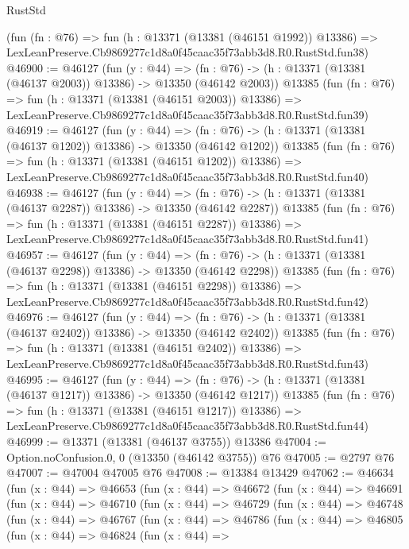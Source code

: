 \begin{lexlean}{RustStd}
\begin{coremodule}
    (fun (fn : @76) =>
    fun (h : @13371 (@13381 (@46151 @1992)) @13386) =>
    LexLeanPreserve.Cb9869277c1d8a0f45caac35f73abb3d8.R0.RustStd.fun38)
@46900 := @46127
    (fun (y : @44) =>
    (fn : @76) -> (h : @13371 (@13381 (@46137 @2003)) @13386) -> @13350 (@46142 @2003))
    @13385
    (fun (fn : @76) =>
    fun (h : @13371 (@13381 (@46151 @2003)) @13386) =>
    LexLeanPreserve.Cb9869277c1d8a0f45caac35f73abb3d8.R0.RustStd.fun39)
@46919 := @46127
    (fun (y : @44) =>
    (fn : @76) -> (h : @13371 (@13381 (@46137 @1202)) @13386) -> @13350 (@46142 @1202))
    @13385
    (fun (fn : @76) =>
    fun (h : @13371 (@13381 (@46151 @1202)) @13386) =>
    LexLeanPreserve.Cb9869277c1d8a0f45caac35f73abb3d8.R0.RustStd.fun40)
@46938 := @46127
    (fun (y : @44) =>
    (fn : @76) -> (h : @13371 (@13381 (@46137 @2287)) @13386) -> @13350 (@46142 @2287))
    @13385
    (fun (fn : @76) =>
    fun (h : @13371 (@13381 (@46151 @2287)) @13386) =>
    LexLeanPreserve.Cb9869277c1d8a0f45caac35f73abb3d8.R0.RustStd.fun41)
@46957 := @46127
    (fun (y : @44) =>
    (fn : @76) -> (h : @13371 (@13381 (@46137 @2298)) @13386) -> @13350 (@46142 @2298))
    @13385
    (fun (fn : @76) =>
    fun (h : @13371 (@13381 (@46151 @2298)) @13386) =>
    LexLeanPreserve.Cb9869277c1d8a0f45caac35f73abb3d8.R0.RustStd.fun42)
@46976 := @46127
    (fun (y : @44) =>
    (fn : @76) -> (h : @13371 (@13381 (@46137 @2402)) @13386) -> @13350 (@46142 @2402))
    @13385
    (fun (fn : @76) =>
    fun (h : @13371 (@13381 (@46151 @2402)) @13386) =>
    LexLeanPreserve.Cb9869277c1d8a0f45caac35f73abb3d8.R0.RustStd.fun43)
@46995 := @46127
    (fun (y : @44) =>
    (fn : @76) -> (h : @13371 (@13381 (@46137 @1217)) @13386) -> @13350 (@46142 @1217))
    @13385
    (fun (fn : @76) =>
    fun (h : @13371 (@13381 (@46151 @1217)) @13386) =>
    LexLeanPreserve.Cb9869277c1d8a0f45caac35f73abb3d8.R0.RustStd.fun44)
@46999 := @13371 (@13381 (@46137 @3755)) @13386
@47004 := Option.noConfusion.{0, 0} (@13350 (@46142 @3755)) @76
@47005 := @2797 @76
@47007 := @47004 @47005 @76
@47008 := @13384 @13429
@47062 := @46634
    (fun (x : @44) =>
    @46653
      (fun (x : @44) =>
      @46672
        (fun (x : @44) =>
        @46691
          (fun (x : @44) =>
          @46710
            (fun (x : @44) =>
            @46729
              (fun (x : @44) =>
              @46748
                (fun (x : @44) =>
                @46767
                  (fun (x : @44) =>
                  @46786
                    (fun (x : @44) =>
                    @46805
                      (fun (x : @44) =>
                      @46824
                        (fun (x : @44) =>

\end{coremodule}
\end{lexlean}
